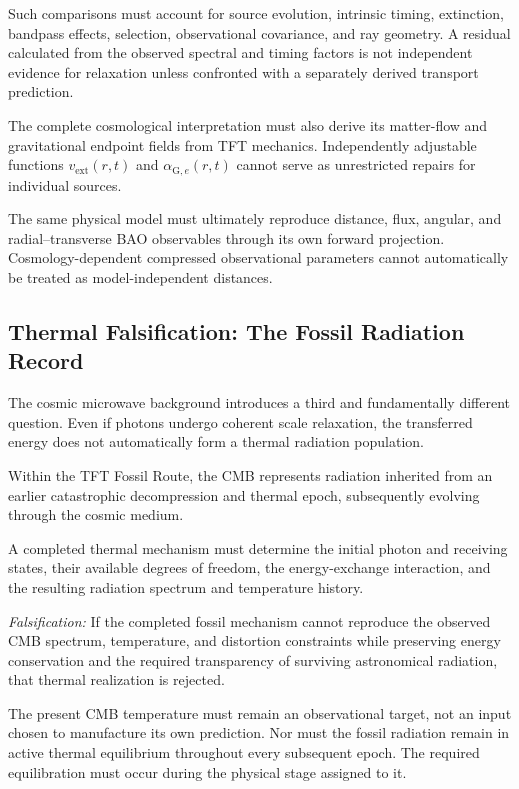 Such comparisons must account for source evolution,
intrinsic timing, extinction, bandpass effects,
selection, observational covariance, and ray geometry.
A residual calculated from the observed spectral and
timing factors is not independent evidence for
relaxation unless confronted with a separately
derived transport prediction.

The complete cosmological interpretation must also
derive its matter-flow and gravitational endpoint
fields from TFT mechanics. Independently adjustable
functions $v_{\mathrm{ext}}(r,t)$ and
$\alpha_{\mathrm G,e}(r,t)$ cannot serve as unrestricted
repairs for individual sources.

The same physical model must ultimately reproduce
distance, flux, angular, and radial--transverse BAO
observables through its own forward projection.
Cosmology-dependent compressed observational
parameters cannot automatically be treated as
model-independent distances.

\subsection{Thermal Falsification: The Fossil Radiation Record}

The cosmic microwave background introduces a third
and fundamentally different question. Even if photons
undergo coherent scale relaxation, the transferred
energy does not automatically form a thermal
radiation population.

Within the TFT Fossil Route, the CMB represents
radiation inherited from an earlier catastrophic
decompression and thermal epoch, subsequently
evolving through the cosmic medium.

A completed thermal mechanism must determine the
initial photon and receiving states, their available
degrees of freedom, the energy-exchange interaction,
and the resulting radiation spectrum and temperature
history.

\noindent\textit{Falsification:}
If the completed fossil mechanism cannot reproduce
the observed CMB spectrum, temperature, and
distortion constraints while preserving energy
conservation and the required transparency of
surviving astronomical radiation, that thermal
realization is rejected.

The present CMB temperature must remain an
observational target, not an input chosen to
manufacture its own prediction. Nor must the
fossil radiation remain in active thermal
equilibrium throughout every subsequent epoch.
The required equilibration must occur during
the physical stage assigned to it.

